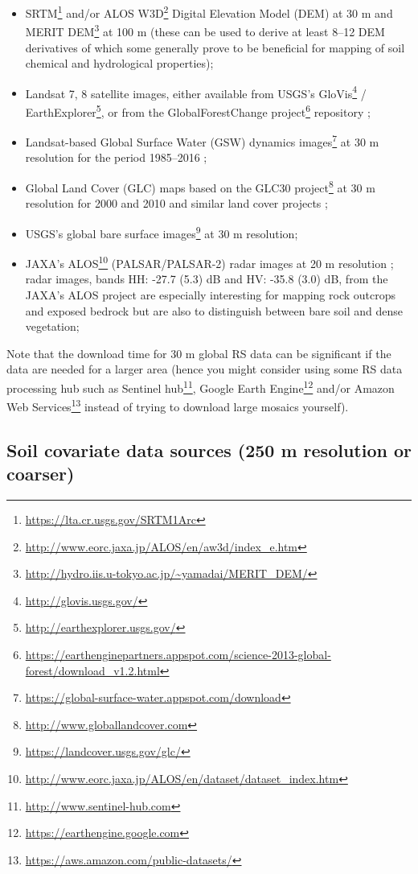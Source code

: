 \documentclass[graybox,natbib,nospthms,UStrade]{svmono}
\renewcommand{\href}[2]{#2 (\url{#1})}
\renewcommand{\href}[2]{#2\footnote{\url{#1}}}
\begin{document}
\begin{itemize}
\item
  \href{https://lta.cr.usgs.gov/SRTM1Arc}{SRTM} and/or \href{http://www.eorc.jaxa.jp/ALOS/en/aw3d/index_e.htm}{ALOS W3D} Digital Elevation Model (DEM) at 30 m and \href{http://hydro.iis.u-tokyo.ac.jp/~yamadai/MERIT_DEM/}{MERIT DEM} at 100 m (these can be used to derive at least 8--12 DEM derivatives of which some generally prove to be beneficial for mapping of soil chemical and hydrological properties);
\item
  Landsat 7, 8 satellite images, either available from USGS's \href{http://glovis.usgs.gov/}{GloVis} / \href{http://earthexplorer.usgs.gov/}{EarthExplorer}, or from the \href{https://earthenginepartners.appspot.com/science-2013-global-forest/download_v1.2.html}{GlobalForestChange project} repository \citep{hansen2013high};
\item
  \href{https://global-surface-water.appspot.com/download}{Landsat-based Global Surface Water (GSW) dynamics images} at 30 m resolution for the period 1985--2016 \citep{pekel2016high};
\item
  Global Land Cover (GLC) maps based on the \href{http://www.globallandcover.com}{GLC30 project} at 30 m resolution for 2000 and 2010 \citep{Chen2014} and similar land cover projects \citep{Herold2016};
\item
  USGS's \href{https://landcover.usgs.gov/glc/}{global bare surface images} at 30 m resolution;
\item
  \href{http://www.eorc.jaxa.jp/ALOS/en/dataset/dataset_index.htm}{JAXA's ALOS} (PALSAR/PALSAR-2) radar images at 20 m resolution \citep{shimada2014new}; radar images, bands HH: -27.7 (5.3) dB and HV: -35.8 (3.0) dB, from the JAXA's ALOS project are especially interesting for mapping rock outcrops and exposed bedrock but are also to distinguish between bare soil and dense vegetation;
\end{itemize}

Note that the download time for 30 m global RS data can be significant if the data are needed for a larger area (hence you might consider using some RS data processing hub such as \href{http://www.sentinel-hub.com}{Sentinel hub}, \href{https://earthengine.google.com}{Google Earth Engine} and/or \href{https://aws.amazon.com/public-datasets/}{Amazon Web Services} instead of trying to download large mosaics yourself).

\hypertarget{soil-covs-250m}{%
\subsection{Soil covariate data sources (250 m resolution or coarser)}\label{soil-covs-250m}}
\end{document}
